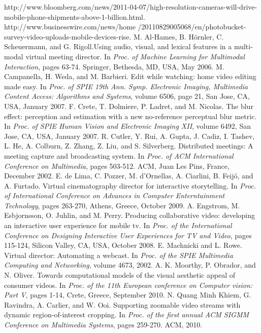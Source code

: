 \documentclass{sig-alternate}
\begin{document}
\begin{thebibliography}{9}
    http://www.bloomberg.com/news/2011-04-07/high-resolution-cameras-will-drive-mobile-phone-shipments-above-1-billion.html.
    http://www.businesswire.com/news/home
    /20110829005068/en/photobucket-survey-video-uploads-mobile-devices-rise. 
    M. Al-Hames, B. Hörnler, C. Scheuermann, and G. Rigoll.Using audio, visual, and lexical features in a multi-modal virtual meeting director. In \textit{Proc. of Machine Learning for Multimodal Interaction}, pages 63-74. Springer, Bethesda, MD, USA, May 2006.
    M. Campanella, H. Weda, and M. Barbieri. Edit while watching: home video editing made easy. In \textit{Proc. of SPIE 19th Ann. Symp. Electronic Imaging, Multimedia Content Access: Algorithms and Systems}, volume 6506, page 21, San Jose, CA, USA, January 2007.
    F. Crete, T. Dolmiere, P. Ladret, and M. Nicolas. The blur effect: perception and estimation with a new no-reference perceptual blur metric. In \textit{Proc. of SPIE Human Vision and Electronic Imaging XII}, volume 6492, San Jose, CA, USA, January 2007.
    R. Cutler, Y. Rui, A. Gupta, J. Cadiz, I. Tashev, L. He, A. Colburn, Z. Zhang, Z. Liu, and S. Silverberg. Distributed meetings: A meeting capture and broadcasting system. In \textit{Proc. of ACM International Conference on Multimedia}, pages 503-512. ACM, Juan Les Pins, France, December 2002.
    E. de Lima, C. Pozzer, M. d\textquoteright Ornellas, A. Ciarlini, B. Feijó, and A. Furtado. Virtual cinematography director for interactive storytelling. In \textit{Proc. of International Conference on Advances in Computer Enterntainment Technology}, pages 263-270, Athens, Greece, October 2009.
    A. Engstrom, M. Esbjornsson, O. Juhlin, and M. Perry. Producing collaborative video: developing an interactive user experience for mobile tv. In \textit{Proc. of the International Conference on Designing Interactive User Experiences for TV and Video}, pages 115-124, Silicon Valley, CA, USA, October 2008.
    E. Machnicki and L. Rowe. Virtual director: Automating a webcast. In \textit{Proc. of the SPIE Multimedia Computing and Networking}, volume 4673, 2002.
    A. K. Moorthy, P. Obrador, and N. Oliver. Towards computational models of the visual aesthetic appeal of consumer videos. In \textit{Proc. of the 11th European conference on Computer vision: Part V}, pages 1-14, Crete, Greece, September 2010.
    N. Quang Minh Khiem, G. Ravindra, A. Carlier, and W. Ooi. Supporting zoomable video streams with dynamic region-of-interest cropping. In \textit{Proc. of the first annual ACM SIGMM Conference on Multimedia Systems}, pages 259-270. ACM, 2010.

\end{thebibliography}
\end{document}

